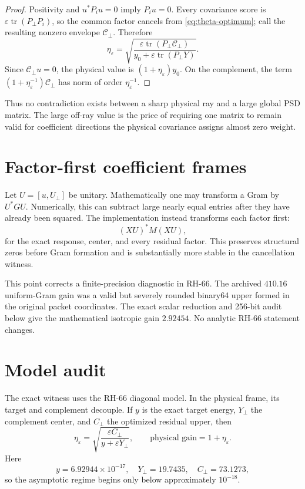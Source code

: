 \documentclass[11pt]{article}
\newcommand{\tr}{\operatorname{tr}}
\begin{document}
\begin{proof}
Positivity and $u^*P_iu=0$ imply $P_iu=0$.  Every covariance score is
$\varepsilon\tr(P_\perp P_i)$, so the common factor cancels from
\eqref{eq:theta-optimum}; call the resulting nonzero envelope
$\mathcal C_\perp$.  Therefore
\[
 \eta_\varepsilon=
 \sqrt{\frac{\varepsilon\tr(P_\perp\mathcal C_\perp)}
 {y_0+\varepsilon\tr(P_\perp Y)}}.
\]
Since $\mathcal C_\perp u=0$, the physical value is
$(1+\eta_\varepsilon)y_0$.  On the complement, the term
$(1+\eta_\varepsilon^{-1})\mathcal C_\perp$ has norm of order
$\eta_\varepsilon^{-1}$.
\end{proof}

Thus no contradiction exists between a sharp physical ray and a large
global PSD matrix.  The large off-ray value is the price of requiring one
matrix to remain valid for coefficient directions the physical covariance
assigns almost zero weight.

\section{Factor-first coefficient frames}
\label{sec:frame}

Let $U=[u,U_\perp]$ be unitary.  Mathematically one may transform a Gram by
$U^*GU$.  Numerically, this can subtract large nearly equal entries after
they have already been squared.  The implementation instead transforms each
factor first:
\begin{equation}
 (XU)^*M(XU),
 \label{eq:factor-first}
\end{equation}
for the exact response, center, and every residual factor.  This preserves
structural zeros before Gram formation and is substantially more stable in
the cancellation witness.

This point corrects a finite-precision diagnostic in RH-66.  The archived
$410.16$ uniform-Gram gain was a valid but severely rounded binary64 upper
formed in the original packet coordinates.  The exact scalar reduction and
256-bit audit below give the mathematical isotropic gain $2.92454$.  No
analytic RH-66 statement changes.

\section{Model audit}
\label{sec:audit}

The exact witness uses the RH-66 diagonal model.  In the physical frame, its
target and complement decouple.  If $y$ is the exact target energy,
$Y_\perp$ the complement center, and $C_\perp$ the optimized residual upper,
then
\begin{equation}
 \eta_\varepsilon=
 \sqrt{\frac{\varepsilon C_\perp}{y+\varepsilon Y_\perp}},
 \qquad
 \text{physical gain}=1+\eta_\varepsilon.
 \label{eq:exact-ledger}
\end{equation}
Here
\[
 y=6.92944\times10^{-17},\quad
 Y_\perp=19.7435,\quad C_\perp=73.1273,
\]
so the asymptotic regime begins only below approximately $10^{-18}$.
\end{document}
